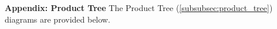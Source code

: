 %

\clearpage
\begin{landscape}
\pagestyle{empty}
\setlength{\textwidth}{\textheight}
\setlength{\linewidth}{\textwidth}

{}
{\large\bfseries\color{ercblue} Appendix: Product Tree}
\noindent The Product Tree (\autoref{subsubsec:product_tree}) diagrams are
provided below.

\clearpage


\end{landscape}
\pagestyle{fancy}
\clearpage
